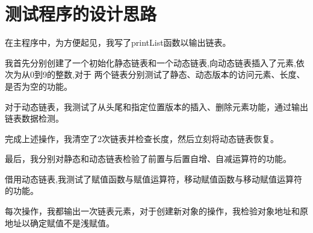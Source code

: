 \documentclass[UTF8]{ctexart}
\begin{document}
\pagestyle{fancy}
\fancyhead{}

\section{测试程序的设计思路}

在主程序中，为方便起见，我写了printList函数以输出链表。\par
我首先分别创建了一个初始化静态链表和一个动态链表,向动态链表插入了元素,依次为从0到9的整数,对于
两个链表分别测试了静态、动态版本的访问元素、长度、是否为空的功能。\par
对于动态链表，我测试了从头尾和指定位置版本的插入、删除元素功能，通过输出链表数据检测。\par
完成上述操作，我清空了2次链表并检查长度，然后立刻将动态链表恢复。\par
最后，我分别对静态和动态链表检验了前置与后置自增、自减运算符的功能。\par
借用动态链表,我测试了赋值函数与赋值运算符，移动赋值函数与移动赋值运算符的功能。\par
每次操作，我都输出一次链表元素，对于创建新对象的操作，我检验对象地址和原地址以确定赋值不是浅赋值。\par
\end{document}
